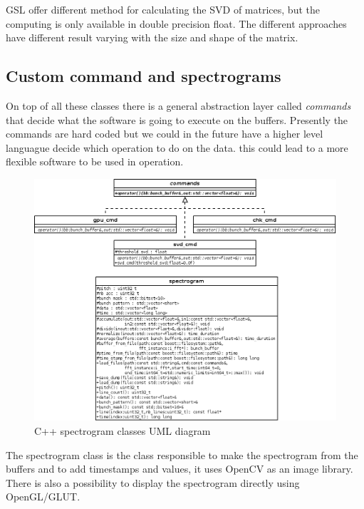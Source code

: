 \Gls{GSL} offer different method for calculating the \gls{SVD} of matrices, but the computing is only available in double precision float. The different approaches have different result varying with the size and shape of the matrix.

\subsection{Custom command and spectrograms}

On top of all these classes there is a general abstraction layer called \emph{commands} that decide what the software is going to execute on the buffers. Presently the commands are hard coded but we could in the future have a higher level languague decide which operation to do on the data. this could lead to a more flexible software to be used in operation.

\begin{figure}[H]
\centering
\label{fig:spectrogram_uml}
\caption{C++ spectrogram classes UML diagram}
\includegraphics[scale=0.3]{spectrogram_uml.png}
\end{figure}

The spectrogram class is the class responsible to make the spectrogram from the buffers and to add timestamps and values, it uses \gls{OpenCV} as an image library. There is also a possibility to display the spectrogram directly using \gls{OpenGL}/GLUT.


